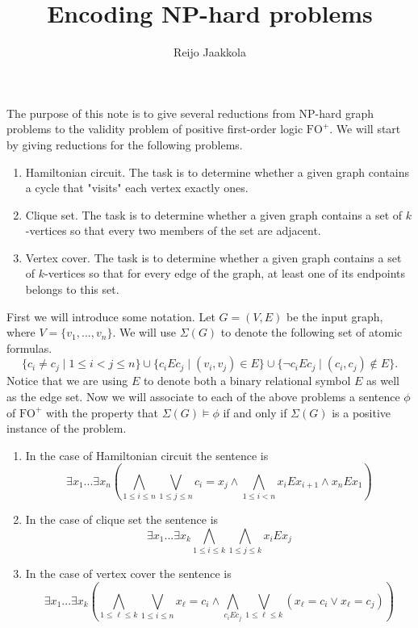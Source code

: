 \documentclass[a4paper,11pt]{article}
\author{Reijo Jaakkola}
\begin{document}
\setlength\abovedisplayskip{3pt}
\setlength\belowdisplayskip{3pt}

\title{Encoding NP-hard  problems}

\theoremstyle{plain}
\newtheorem{theorem}{Theorem}[section]
\newtheorem{lemma}[theorem]{Lemma}
\newtheorem{corollary}[theorem]{Corollary}
\newtheorem{proposition}[theorem]{Proposition}
\theoremstyle{definition}
\newtheorem{definition}[theorem]{Definition}
\newtheorem{remark}[theorem]{Remark}
\newtheorem{example}[theorem]{Example}

\newcommand{\PFO}{\mathrm{FO}^+}

\maketitle


The purpose of this note is to give several reductions from NP-hard graph problems to the validity problem of positive first-order logic $\PFO$. We will start by giving reductions for the following
problems.
\begin{enumerate}
	\item Hamiltonian circuit. The task is to determine whether a given graph contains a cycle that "visits" each vertex exactly ones.
           \item Clique set. The task is to determine whether a given graph contains a set of $k$-vertices so that every two members of the set are adjacent.
           \item Vertex cover. The task is to determine whether a given graph contains a set of $k$-vertices so that for every edge of the graph, at least one of its endpoints belongs to this set.
\end{enumerate}
First we will introduce some notation. Let $G = (V,E)$ be the input graph, where $V = \{v_1,...,v_n\}$. We will use $\Sigma(G)$ to denote
the following set of atomic formulas.
\[\{c_i \neq c_j \mid 1\leq i < j \leq n\} \cup \{c_i E c_j \mid (v_i,v_j) \in E\} \cup \{\neg c_i E c_j \mid (c_i,c_j) \not\in E\}.\]
Notice that we are using $E$ to denote both a binary relational symbol $E$ as well as the edge set. Now we will associate to each of the above problems a sentence $\phi$
of $\PFO$ with the property that $\Sigma(G)\models \phi$ if and only if $\Sigma(G)$ is a positive instance of the problem.
\begin{enumerate}
	\item In the case of Hamiltonian circuit the sentence is
	\[\exists x_1 ... \exists x_n (\bigwedge_{1\leq i\leq n} \bigvee_{1\leq j\leq n} c_i = x_j \land \bigwedge_{1\leq i < n} x_i E x_{i+1} \land x_n E x_1)\]
	\item In the case of clique set the sentence is
	\[\exists x_1 ... \exists x_k \bigwedge_{1\leq i \leq k} \bigwedge_{1\leq j\leq k} x_i E x_j\]
	\item In the case of vertex cover the sentence is
	\[\exists x_1 ... \exists x_k (\bigwedge_{1\leq \ell \leq k} \bigvee_{1\leq i \leq n} x_\ell = c_i \land \bigwedge_{c_i E c_j} \bigvee_{1\leq \ell \leq k} (x_\ell = c_i \lor x_\ell = c_j))\]
\end{enumerate}
\end{document}
